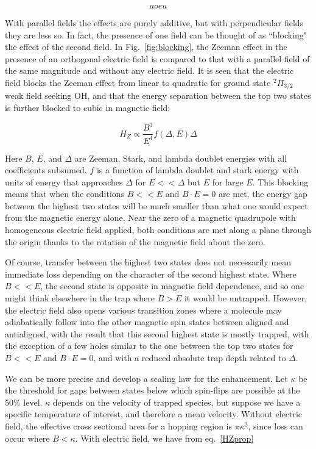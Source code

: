 \documentclass[%
 reprint,
 amsmath,amssymb,
 aps,
prl,
]{revtex4-1}
\begin{document}
\begin{equation}
aoeu
\end{equation}

With parallel fields the effects are purely additive, but with perpendicular fields they are less so. In fact, the presence of one field can be thought of as ``blocking" the effect of the second field. In Fig.~\ref{fig:blocking}, the Zeeman effect in the presence of an orthogonal electric field is compared to that with a parallel field of the same magnitude and without any electric field. It is seen that the electric field blocks the Zeeman effect from linear to quadratic for ground state $^2\Pi_{3/2}$ weak field seeking OH, and that the energy separation between the top two states is further blocked to cubic in magnetic field:

\begin{equation}
\label{eq:HZprop}
H_Z\propto \frac{B^3}{E^4}f(\Delta,E)\Delta
\end{equation}

\noindent Here $B$, $E$, and $\Delta$ are Zeeman, Stark, and lambda doublet energies with all coefficients subsumed. $f$ is a function of lambda doublet and stark energy with units of energy that approaches $\Delta$ for $E << \Delta$ but $E$ for large $E$. This blocking means that when the conditions $B<<E$ and $B\cdot E=0$ are met, the energy gap between the highest two states will be much smaller than what one would expect from the magnetic energy alone. Near the zero of a magnetic quadrupole with homogeneous electric field applied, both conditions are met along a plane through the origin thanks to the rotation of the magnetic field about the zero. 

Of course, transfer between the highest two states does not necessarily mean immediate loss depending on the character of the second highest state. Where $B<<E$, the second state is opposite in magnetic field dependence, and so one might think elsewhere in the trap where $B>E$ it would be untrapped. However, the electric field also opens various transition zones where a molecule may adiabatically follow into the other magnetic spin states between aligned and antialigned, with the result that this second highest state is mostly trapped, with the exception of a few holes similar to the one between the top two states for $B<<E$ and $B\cdot E = 0$, and with a reduced absolute trap depth related to $\Delta$. 

We can be more precise and develop a scaling law for the enhancement. Let $\kappa$ be the threshold for gaps between states below which spin-flips are possible at the 50\% level. $\kappa$ depends on the velocity of trapped species, but suppose we have a specific temperature of interest, and therefore a mean velocity. Without electric field, the effective cross sectional area for a hopping region is $\pi \kappa^2$, since loss can occur where $B<\kappa$. With electric field, we have from eq.~\ref{HZprop}
\end{document}
